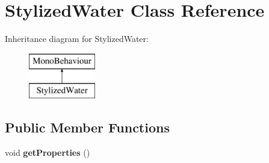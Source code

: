 \hypertarget{class_stylized_water}{}\section{Stylized\+Water Class Reference}
\label{class_stylized_water}
Inheritance diagram for Stylized\+Water\+:\begin{figure}[H]
\begin{center}
\leavevmode
\includegraphics[height=2.000000cm]{class_stylized_water}
\end{center}
\end{figure}
\subsection*{Public Member Functions}
\begin{DoxyCompactItemize}
\item 
\mbox{\label{class_stylized_water_a59b65fef6d92c4a65bc684b4b911ae3e}} 
void {\bfseries get\+Properties} ()
\end{DoxyCompactItemize}
